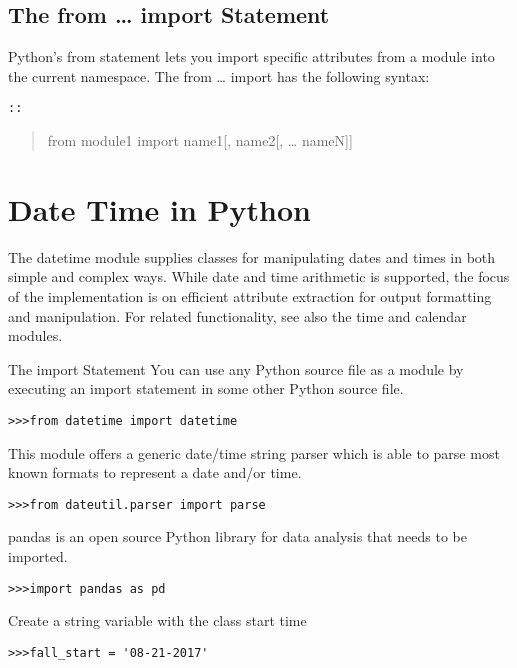 \subsection{The from \ldots{} import
Statement}\label{the-from-import-statement}

Python's from statement lets you import specific attributes from a
module into the current namespace. The from \ldots{} import has the
following syntax:

\begin{verbatim}
::
\end{verbatim}

\begin{quote}
from module1 import name1{[}, name2{[}, \ldots{} nameN{]}{]}
\end{quote}

\section{Date Time in Python}\label{date-time-in-python}

The datetime module supplies classes for manipulating dates and times in
both simple and complex ways. While date and time arithmetic is
supported, the focus of the implementation is on efficient attribute
extraction for output formatting and manipulation. For related
functionality, see also the time and calendar modules.

The import Statement You can use any Python source file as a module by
executing an import statement in some other Python source file.

\begin{verbatim}
>>>from datetime import datetime
\end{verbatim}

This module offers a generic date/time string parser which is able to
parse most known formats to represent a date and/or time.

\begin{verbatim}
>>>from dateutil.parser import parse
\end{verbatim}

pandas is an open source Python library for data analysis that needs to
be imported.

\begin{verbatim}
>>>import pandas as pd
\end{verbatim}

Create a string variable with the class start time

\begin{verbatim}
>>>fall_start = '08-21-2017'
\end{verbatim}

